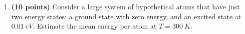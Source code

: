 \documentclass[fleqn]{article}
\begin{document}
\begin{enumerate}
    \item \textbf{(10 points)} Consider a large system of hypothetical atoms that have just two energy states: a
    ground state with zero energy, and an excited state at $0.01 ~ eV$. Estimate the mean energy per
    atom at $T=300 ~ K$.

      \textcolor{hwColor}{
        \\
      }

  \end{enumerate}
\end{document}
